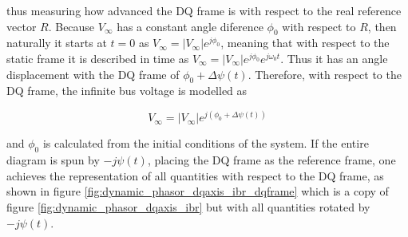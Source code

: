 \begin{example}
	\noindent thus measuring how advanced the DQ frame is with respect to the real reference vector $R$. Because $V_\infty$ has a constant angle diference $\phi_0$ with respect to $R$, then naturally it starts at $t=0$ as $V_\infty = \left\lvert V_\infty\right\rvert e^{j\phi_0}$, meaning that with respect to the static frame it is described in time as $V_\infty = \left\lvert V_\infty\right\rvert e^{j\phi_0}e^{j\omega_0 t}$. Thus it  has an angle displacement with the DQ frame of $\phi_0 + \Delta\psi(t)$. Therefore, with respect to the DQ frame, the infinite bus voltage is modelled as

\begin{equation} V_\infty = \left\lvert V_\infty\right\rvert e^{j\left(\phi_0 + \Delta\psi(t)\right)} \end{equation}

	\noindent and $\phi_0$ is calculated from the initial conditions of the system.  If the entire diagram is spun by $-j\psi(t)$, placing the DQ frame as the reference frame, one achieves the representation of all quantities with respect to the DQ frame, as shown in figure \ref{fig:dynamic_phasor_dqaxis_ibr_dqframe} which is a copy of figure \ref{fig:dynamic_phasor_dqaxis_ibr} but with all quantities rotated by $-j\psi(t)$.

\begin{figure}[htb!]
\centering
{}
\end{figure}
\end{example}
